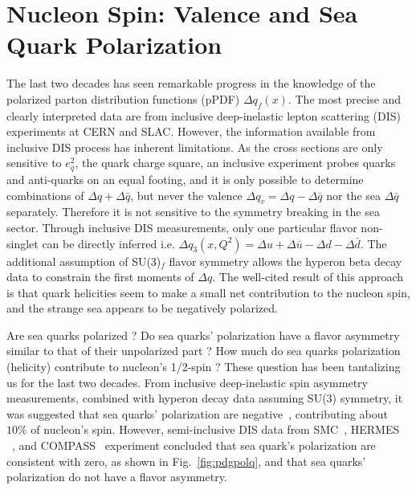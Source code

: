 
\section{Nucleon Spin: Valence and Sea Quark Polarization}
\label{sec:introduction}
The last two decades has seen remarkable progress in the knowledge 
of the polarized parton distribution functions (pPDF)
  $\Delta q_f(x)$.
The most precise and clearly interpreted data are from inclusive deep-inelastic
 lepton scattering (DIS)
experiments at CERN and SLAC. 
However, the information available from inclusive DIS process has inherent 
limitations.  As the cross 
sections are only sensitive to $e_q^2$, the quark charge square,
an inclusive experiment probes quarks and anti-quarks on an equal footing, and
 it is only possible to determine combinations of $\Delta q + \Delta \bar{q}$, 
but never the valence $\Delta q_v=\Delta q - \Delta \bar{q}$ nor the sea $\Delta \bar{q}$ separately.    
 Therefore it is not sensitive to the symmetry breaking in the sea sector. 
Through inclusive DIS measurements, only one particular flavor non-singlet can be directly 
inferred  i.e.  $\Delta q_{3}(x,Q^2)=\Delta u+\Delta \bar{u}-\Delta d-\Delta \bar{d}$. 
The additional assumption of SU(3)$_f$ flavor symmetry allows the hyperon beta decay data
to constrain the first moments of $\Delta q$.
The well-cited result of this approach is
that quark helicities seem to make a small net contribution to the nucleon spin, and the
strange sea appears to be negatively polarized.

Are sea quarks polarized ?  Do sea quarks' polarization have a flavor asymmetry similar to that of  their unpolarized part ?  
  How much do sea quarks polarization  (helicity) contribute to nucleon's 1/2-spin ? 
These question has been tantalizing us for the last  two decades.   From inclusive deep-inelastic spin asymmetry measurements, combined with hyperon decay data assuming  SU(3) symmetry, it was suggested that sea quarks' polarization are negative~\cite{Blumlein:2010rn},  contributing about $10\%$ of nucleon's spin.  
 However,  semi-inclusive DIS data from SMC~\cite{Adeva:1997qz}, HERMES ~\cite{Airapetian:2004zf}, and COMPASS~\cite{Alekseev:2010ub} experiment concluded that sea quark's polarization are consistent with zero,  as shown in Fig.~\ref{fig:pdgpolq},  and that sea quarks' polarization do not have a flavor asymmetry.

